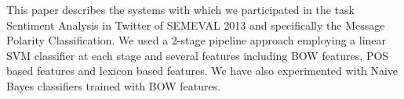 This paper describes the systems with which we participated in the task Sentiment Analysis
 in Twitter of SEMEVAL 2013 and specifically
 the Message Polarity Classification. We used
 a 2-stage pipeline approach employing a linear
 SVM classifier at each stage and several
 features including BOW features, POS based
 features and lexicon based features. We have
 also experimented with Naive Bayes classifiers
 trained with BOW features.

